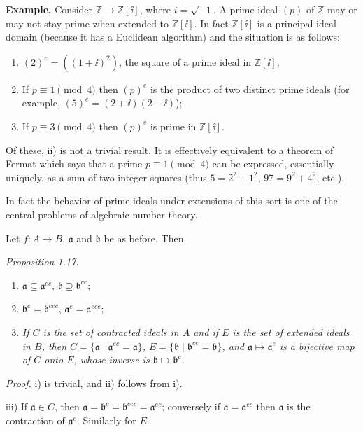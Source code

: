 \noindent\textbf{Example.} Consider $\mathbb Z\longrightarrow\mathbb Z[\ii]$, where $i=\sqrt{-1}$. A prime ideal $(p)$ of $\mathbb Z$ may or may not stay prime when extended to $\mathbb Z[\ii]$. In fact $\mathbb Z[\ii]$ is a principal ideal domain (because it has a Euclidean algorithm) and the situation is as follows:
\begin{enumerate}
\renewcommand{\labelenumi}{\roman{enumi})}
\item $(2)^e=((1+\ii)^2)$, the square of a prime ideal in $\mathbb Z[\ii]$;
\item If $p\equiv1\pmod 4$ then $(p)^e$ is the product of two distinct prime ideals (for example, $(5)^e=(2+\ii)(2-\ii)$);
\item If $p\equiv3\pmod 4$ then $(p)^e$ is prime in $\mathbb Z[\ii]$.
\end{enumerate}
Of these, ii) is not a trivial result. It is effectively equivalent to a theorem of Fermat which says that a prime $p\equiv1\pmod 4$ can be expressed, essentially uniquely, as a sum of two integer squares (thus $5=2^2+1^2$, $97=9^2+4^2$, etc.).

In fact the behavior of prime ideals under extensions of this sort is one of the central problems of algebraic number theory.

Let $f:A\longrightarrow B$, $\mathfrak a$ and $\mathfrak b$ be as before. Then

\noindent\textit{Proposition 1.17.}
\begin{enumerate}
\renewcommand{\labelenumi}{\roman{enumi})}
\item $\mathfrak a\subseteq\mathfrak a^{ec}$, $\mathfrak b\supseteq\mathfrak b^{ce}$;
\item $\mathfrak b^c=\mathfrak b^{cec}$, $\mathfrak a^e=\mathfrak a^{ece}$;
\item \textit{If $C$ is the set of contracted ideals in $A$ and if $E$ is the set of extended ideals in $B$, then $C=\{\mathfrak a\mid\mathfrak a^{ec}=\mathfrak a\}$, $E=\{\mathfrak b\mid\mathfrak b^{ce}=\mathfrak b\}$, and $\mathfrak a\mapsto\mathfrak a^e$ is a bijective map of $C$ onto $E$, whose inverse is $\mathfrak b\mapsto\mathfrak b^c$.}
\end{enumerate}

\noindent\textit{Proof.} i) is trivial, and ii) follows from i).

iii) If $\mathfrak a\in C$, then $\mathfrak a=\mathfrak b^c=\mathfrak b^{cec}=\mathfrak a^{ec}$; conversely if $\mathfrak a=\mathfrak a^{ec}$ then $\mathfrak a$ is the contraction of $\mathfrak a^e$. Similarly for $E$. \proofbox

